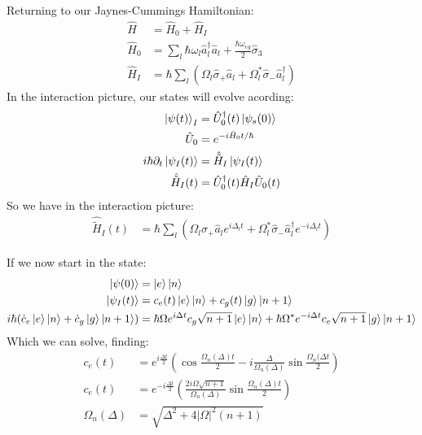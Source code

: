 Returning to our Jaynes-Cummings Hamiltonian:
\begin{align*}
	\hat{H} &= \hat{H}_0 + \hat{H}_I \\
	\hat{H}_0 &= \sum_l \hbar\omega_l\hat{a}_l^\dagger\hat{a}_l + \frac{\hbar\omega_{eg}}{2}\hat{\sigma}_3 \\
	\hat{H}_I &= \hbar\sum_l (\Omega_l \hat{\sigma}_+\hat{a}_l + \Omega_l^* \hat{\sigma}_-\hat{a}^\dagger_l)
\end{align*}
In the interaction picture, our states will evolve acording:
\begin{align*}
	\ket{\psi(t)}_I &= \hat{U}_0^\dagger(t) \ket{\psi_s(0)} \\
	\hat{U}_0 &= e^{-i\hat{H}_0 t/\hbar} \\
	i\hbar \partial_t \ket{\psi_I(t)} &= \hat{\tilde{H}}_I\ket{\psi_I(t)} \\
	\hat{\tilde{H}}_I(t) &= \hat{U}_0^\dagger(t)\hat{H}_I\hat{U}_0(t)
\end{align*}
So we have in the interaction picture:
\begin{align*}
	\hat{\tilde{H}}_I(t) &= \hbar\sum_l (\Omega_l\hat{\sigma}_+\hat{a}_l e^{i\Delta_l t} + \Omega_l^*\hat{\sigma}_-\hat{a}_l^\dagger e^{-i\Delta_l t})
\end{align*}

If we now start in the state:
\begin{align*}
	\ket{\psi(0)} &= \ket{e}\ket{n} \\
	\ket{\psi_I(t)} &=  c_e(t)\ket{e}\ket{n} + c_g(t)\ket{g}\ket{n+1} \\
	i\hbar(\dot{c}_e\ket{e}\ket{n} + \dot{c}_g\ket{g}\ket{n+1}) &= \hbar\Omega e^{i\Delta t} c_g \sqrt{n+1}\ket{e}\ket{n} + \hbar\Omega^*e^{-i\Delta t}c_e \sqrt{n+1}\ket{g}\ket{n+1}
\end{align*}
Which we can solve, finding:
\begin{align*}
	c_e(t) &= e^{i\frac{\Delta t}{2}}\left(\cos\frac{\Omega_n(\Delta)t}{2} - i \frac{\Delta}{\Omega_n(\Delta)} \sin\frac{\Omega_n(\Delta t}{2}\right) \\
	c_e(t) &= e^{-i\frac{\Delta t}{2}}\left(\frac{2i\Omega\sqrt{n+1}}{\Omega_n(\Delta)}\sin\frac{\Omega_n(\Delta)t}{2}\right) \\
	\Omega_n(\Delta) &= \sqrt{\Delta^2 + 4|\Omega|^2(n+1)}
\end{align*}
